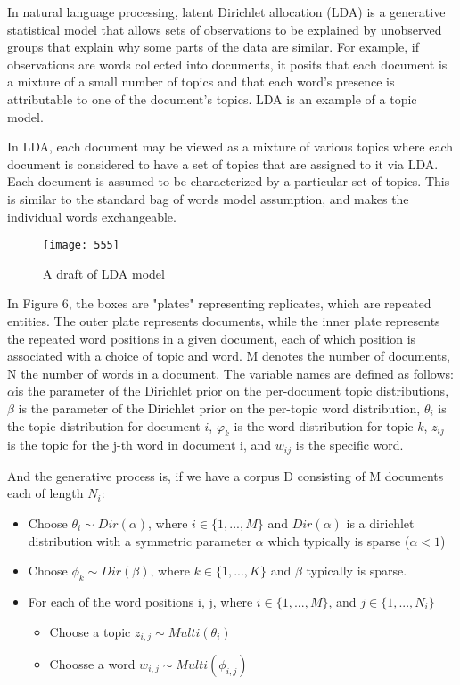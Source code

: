\documentclass[12pt]{extarticle}
\begin{document}
In natural language processing, latent Dirichlet allocation (LDA) is a generative statistical model that allows sets of observations to be explained by unobserved groups that explain why some parts of the data are similar. For example, if observations are words collected into documents, it posits that each document is a mixture of a small number of topics and that each word's presence is attributable to one of the document's topics. LDA is an example of a topic model.

In LDA, each document may be viewed as a mixture of various topics where each document is considered to have a set of topics that are assigned to it via LDA. Each document is assumed to be characterized by a particular set of topics. This is similar to the standard bag of words model assumption, and makes the individual words exchangeable.

\begin{figure}
	\centering
	\texttt{[image: 555]}
	\caption{A draft of LDA model}
	\label{fig:555}
\end{figure}

In Figure 6, the boxes are "plates" representing replicates, which are repeated entities. The outer plate represents documents, while the inner plate represents the repeated word positions in a given document, each of which position is associated with a choice of topic and word. M denotes the number of documents, N the number of words in a document. The variable names are defined as follows:
$\alpha$is the parameter of the Dirichlet prior on the per-document topic distributions,
$\beta$ is the parameter of the Dirichlet prior on the per-topic word distribution,
$ \theta _{i}$ is the topic distribution for document $i$,
$ \varphi _{k}$ is the word distribution for topic $k$,
$ z_{ij}$ is the topic for the j-th word in document i, and
$w_{ij}$ is the specific word.

And the generative process is, if we have a corpus D consisting of M documents each of length $N_i$:

\begin{itemize}
	\item Choose $\theta_i \sim Dir(\alpha)$, where $ i \in \{1, ..., M \}$ and $Dir(\alpha)$ is a dirichlet distribution with a symmetric parameter $\alpha$ which typically is sparse ($\alpha < 1 $)
	\item Choose $\phi_k \sim Dir(\beta)$, where $k \in \{1,...,K \}$ and $\beta$ typically is sparse.
	\item For each of the word positions i, j, where $i \in \{1,...,M\}$, and $j \in \{1,...,N_i\}$ 
	\begin{itemize}
		\item Choose a topic $z_{i,j} \sim Multi(\theta_i)$
		\item Choosse a word $w_{i,j} \sim Multi(\phi_{i,j})$
	\end{itemize}
\end{itemize} 
\end{document}

